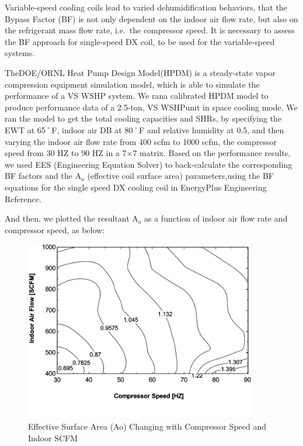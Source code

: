 Variable-speed cooling coils lead to varied dehumidification behaviors, that the Bypass Factor (BF) is not only dependent on the indoor air flow rate, but also on the refrigerant mass flow rate, i.e.~the compressor speed. It is necessary to assess the BF approach for single-speed DX coil, to be used for the variable-speed systems.

TheDOE/ORNL Heat Pump Design Model(HPDM) is a steady-state vapor compression equipment simulation model, which is able to simulate the performance of a VS WSHP system. We rana calibrated HPDM model to produce performance data of a 2.5-ton, VS WSHPunit in space cooling mode. We ran the model to get the total cooling capacities and SHRs, by specifying the EWT at 65˚F, indoor air DB at 80˚F and relative humidity at 0.5, and then varying the indoor air flow rate from 400 scfm to 1000 scfm, the compressor speed from 30 HZ to 90 HZ in a 7×7 matrix. Based on the performance results, we used EES (Engineering Equation Solver) to back-calculate the corresponding BF factors and the A\(_{o}\) (effective coil surface area) parameters,using the BF equations for the single speed DX cooling coil in EnergyPlus Engineering Reference.

And then, we plotted the resultant A\(_{o}\) as a function of indoor air flow rate and compressor speed, as below:

\begin{figure}[hbtp] %
\centering
\includegraphics[width=0.9\textwidth, height=0.9\textheight, keepaspectratio=true]{media/image4240.svg.png}
\caption{Effective Surface Area (Ao) Changing with Compressor Speed and Indoor SCFM \protect \label{fig:effective-surface-area-ao-changing-with}}
\end{figure}

